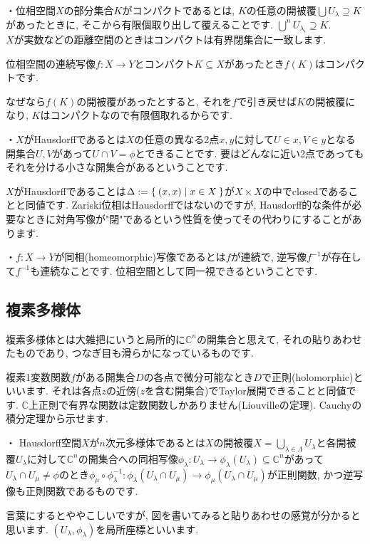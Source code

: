 \documentclass{jsarticle}
\newcommand{\CC}{\mathbb{C}}
\theoremstyle{definition}
\numberwithin{theorem}{section}
\begin{document}
・位相空間$X$の部分集合$K$がコンパクトであるとは, $K$の任意の開被覆$\bigcup U_\lambda \supseteq K$があったときに, そこから有限個取り出して覆えることです. $\bigcup^n U_{\lambda_i} \supseteq K$.\\
$X$が実数などの距離空間のときはコンパクトは有界閉集合に一致します.

位相空間の連続写像$f: X \rightarrow Y$とコンパクト$K\subseteq X$があったとき$f(K)$はコンパクトです.

なぜなら$f(K)$の開被覆があったとすると, それを$f$で引き戻せば$K$の開被覆になり, $K$はコンパクトなので有限個取れるからです.

・$X$がHausdorffであるとは$X$の任意の異なる2点$x, y$に対して$U \in x, V \in y$となる開集合$U, V$があって$U \cap V = \phi$とできることです. 要はどんなに近い2点であってもそれを分ける小さな開集合があるということです.

$X$がHausdorffであることは$\Delta := \Set{(x, x) | x \in X}$が$X \times X$の中でclosedであることと同値です. Zariski位相はHausdorffではないのですが, Hausdorff的な条件が必要なときに対角写像が"閉"であるという性質を使ってその代わりにすることがあります.

・$f: X \rightarrow Y$が同相(homeomorphic)写像であるとは$f$が連続で, 逆写像$f^{-1}$が存在して$f^{-1}$も連続なことです. 位相空間として同一視できるということです.

\subsection{複素多様体}
複素多様体とは大雑把にいうと局所的に$\CC^n$の開集合と思えて, それの貼りあわせたものであり, つなぎ目も滑らかになっているものです.

複素1変数関数$f$がある開集合$D$の各点で微分可能なとき$D$で正則(holomorphic)といいます. それは各点$z$の近傍($z$を含む開集合)でTaylor展開できることと同値です. $\CC$上正則で有界な関数は定数関数しかありません(Liouvilleの定理). Cauchyの積分定理から示せます.

・ Hausdorff空間$X$が$n$次元多様体であるとは$X$の開被覆$X = \bigcup_{\lambda \in \Lambda} U_\lambda$と各開被覆$U_\lambda$に対して$\CC^n$の開集合への同相写像$\phi_\lambda : U_\lambda \rightarrow \phi_\lambda(U_\lambda) \subseteq \CC^n$があって$U_\lambda \cap U_\mu \neq \phi$のとき$\phi_\mu\circ\phi_\lambda^{-1} : \phi_\lambda(U_\lambda\cap U_\mu) \rightarrow \phi_\mu(U_\lambda\cap U_\mu)$が正則関数, かつ逆写像も正則関数であるものです. 

言葉にするとややこしいですが, 図を書いてみると貼りあわせの感覚が分かると思います. $(U_\lambda, \phi_\lambda)$を局所座標といいます.
\end{document}
